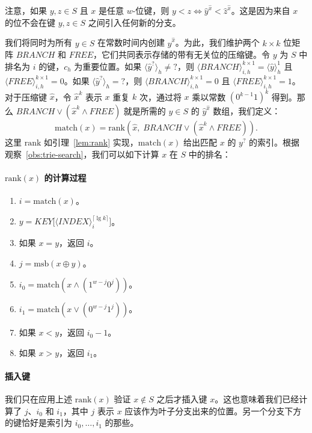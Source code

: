 \documentclass[11pt,a4paper]{ctexart}
\newcommand{\tto}{\text{0}}
\newcommand{\ttl}{\text{1}}
\newcommand{\ttq}{\text{?}}
\newcommand{\lpiece}[3]{\langle #1 \rangle_{#2}^{#3}}
\newcommand{\lpieceq}[2]{\langle #1 \rangle_{#2}}
\newcommand{\AND}{\land}
\newcommand{\OR}{\lor}
\newcommand{\XOR}{\oplus}
\newcommand{\MSB}{\text{msb}}
\newcommand{\RANK}{\text{rank}}
\newcommand{\MATCH}{\text{match}}
\newcommand{\ceiling}[1]{\lceil #1 \rceil}
\begin{document}
注意，如果 $y, z \in S$ 且 $x$ 是任意 $w$-位键，则 $y < z \iff \hat{y}^{\hat{x}} < \hat{z}^{\hat{x}}$。这是因为来自 $x$ 的位不会在键 $y, z \in S$ 之间引入任何新的分支。

我们将同时为所有 $y \in S$ 在常数时间内创建 $\hat{y}^{\hat{x}}$。为此，我们维护两个 $k \times k$ 位矩阵 $BRANCH$ 和 $FREE$，它们共同表示存储的带有无关位的压缩键。令 $y$ 为 $S$ 中排名为 $i$ 的键，$c_h$ 为重要位置。如果 $\lpieceq{\hat{y}^{\ttq}}{h} \neq \ttq$，则 $\lpiece{BRANCH}{i,h}{k \times 1} = \lpiece{\hat{y}}{h}{1}$ 且 $\lpiece{FREE}{i,h}{k \times 1} = \tto$。如果 $\lpieceq{\hat{y}^{\ttq}}{h} = \ttq$，则 $\lpiece{BRANCH}{i,h}{k \times 1} = \tto$ 且 $\lpiece{FREE}{i,h}{k \times 1} = \ttl$。对于压缩键 $\hat{x}$，令 $\hat{x}^k$ 表示 $x$ 重复 $k$ 次，通过将 $x$ 乘以常数 $(\tto^{k-1}\ttl)^k$ 得到。那么 $BRANCH \OR (\hat{x}^k \AND FREE)$ 就是所需的 $y \in S$ 的 $\hat{y}^{\hat{x}}$ 数组，我们定义：
\[
\MATCH(x) = \RANK(\hat{x},\; BRANCH \OR (\hat{x}^k \AND FREE)).
\]
这里 $\RANK$ 如引理~\ref{lem:rank} 实现，$\MATCH(x)$ 给出匹配 $x$ 的 $y^{\ttq}$ 的索引。根据观察~\ref{obs:trie-search}，我们可以如下计算 $x$ 在 $S$ 中的排名：

\paragraph{$\RANK(x)$ 的计算过程}
\begin{enumerate}
\item $i = \MATCH(x)$。
\item $y = KEY\bigl[\lpiece{INDEX}{i}{\ceiling{\lg k}}\bigr]$。
\item 如果 $x = y$，返回 $i$。
\item $j = \MSB(x \XOR y)$。
\item $i_0 = \MATCH(x \AND (\ttl^{w-j}\tto^j))$。
\item $i_1 = \MATCH(x \OR (\tto^{w-j}\ttl^j))$。
\item 如果 $x < y$，返回 $i_0 - 1$。
\item 如果 $x > y$，返回 $i_1$。
\end{enumerate}

\paragraph{插入键}
我们只在应用上述 $\RANK(x)$ 验证 $x \notin S$ 之后才插入键 $x$。这也意味着我们已经计算了 $j$、$i_0$ 和 $i_1$，其中 $j$ 表示 $x$ 应该作为叶子分支出来的位置。另一个分支下方的键恰好是索引为 $i_0, \dots, i_1$ 的那些。
\end{document}
